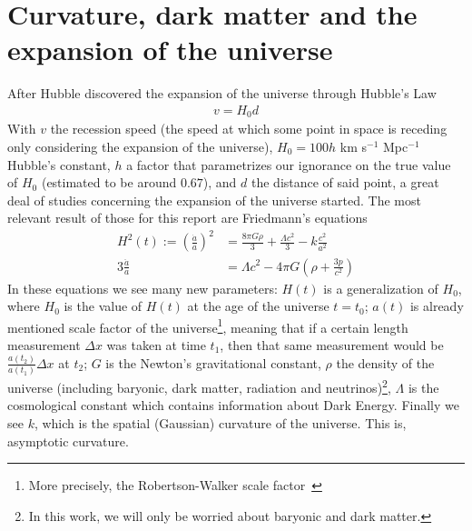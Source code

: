 \section{Curvature, dark matter and the expansion of the universe}
After Hubble discovered the expansion of the universe through Hubble's Law\cite{Hubble1929}
\begin{align}
	v = H_0 d
	\label{eq:ley-hubble}
\end{align}
With $v$ the recession speed (the speed at which some point in space is receding only considering the expansion of the universe), $H_0=100h$ km s$^{-1}$ Mpc$^{-1}$ Hubble's constant, $h$ a factor that parametrizes our ignorance on the true value of $H_0$ (estimated to be around $0.67$), and $d$ the distance of said point, a great deal of studies concerning the expansion of the universe started. The most relevant result of those for this report are Friedmann's equations \\
\begin{align}
	H^2(t) := \left(\frac{\dot a}{a}\right)^2 &=  \frac{8\pi G \rho}{3} +\frac{\Lambda c^2}{3} - k \frac{c^2}{a^2}
	\label{eq:1a-friedmann}\\
	3 \frac{\ddot a}{a} &= \Lambda c^2 - 4\pi G \left( \rho + \frac{3p}{c^2} \right) 
	\label{eq:2a-friedmann}
\end{align}
In these equations we see many new parameters: $H(t)$ is a generalization of $H_0$, where $H_0$ is the value of $H(t)$ at the age of the universe $t=t_0$; $a(t)$ is already mentioned scale factor of the universe\footnote{More precisely, the Robertson-Walker scale factor~\cite{cosmology}}, meaning that if a certain length measurement $\Delta x$ was taken at time $t_1$, then that same measurement would be $\frac{a(t_2)}{a(t_1)}\Delta x$ at $t_2$; $G$ is the Newton's gravitational constant, $\rho$ the density of the universe (including baryonic, dark matter, radiation and neutrinos)\footnote{In this work, we will only be worried about baryonic and dark matter.}, $\Lambda$ is the cosmological constant which contains information about Dark Energy. Finally we see $k$, which is the spatial (Gaussian) curvature of the universe. This is, asymptotic curvature. \\

